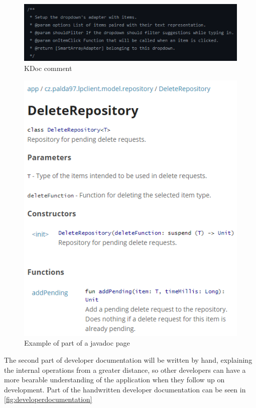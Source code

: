 \begin{figure}\centering
	\includegraphics[width=1\textwidth]{pics/kdoccomment.png}
	\caption[KDoc comment]{KDoc comment}\label{fig:kdoc}
\end{figure}

\begin{figure}\centering
	\includegraphics[width=1\textwidth]{pics/javadoc.png}
	\caption[Example of part of a javadoc page]{Example of part of a javadoc page}\label{fig:javadoc}
\end{figure}

The second part of developer documentation will be written by hand, explaining the internal operations from a greater distance, so other developers can have a more bearable understanding of the application when they follow up on development.
Part of the handwritten developer documentation can be seen in \autoref{fig:developerdocumentation}

